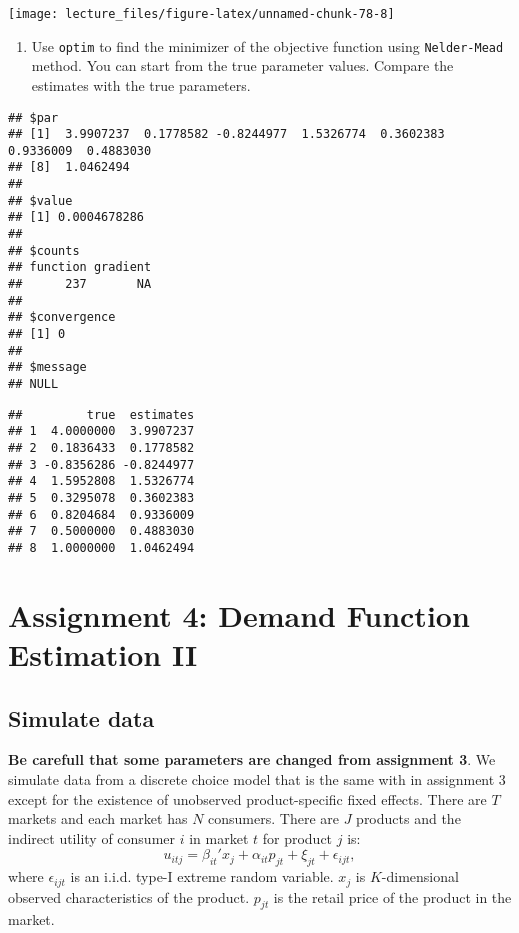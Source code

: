 \documentclass[
]{book}
\providecommand{\tightlist}{%
  \setlength{\itemsep}{0pt}\setlength{\parskip}{0pt}}
\begin{document}
\begin{center}\texttt{[image: lecture\_files/figure-latex/unnamed-chunk-78-8]} \end{center}

\begin{enumerate}
\def\labelenumi{\arabic{enumi}.}
\setcounter{enumi}{7}
\tightlist
\item
  Use \texttt{optim} to find the minimizer of the objective function using \texttt{Nelder-Mead} method. You can start from the true parameter values. Compare the estimates with the true parameters.
\end{enumerate}

\begin{verbatim}
## $par
## [1]  3.9907237  0.1778582 -0.8244977  1.5326774  0.3602383  0.9336009  0.4883030
## [8]  1.0462494
## 
## $value
## [1] 0.0004678286
## 
## $counts
## function gradient 
##      237       NA 
## 
## $convergence
## [1] 0
## 
## $message
## NULL
\end{verbatim}

\begin{verbatim}
##         true  estimates
## 1  4.0000000  3.9907237
## 2  0.1836433  0.1778582
## 3 -0.8356286 -0.8244977
## 4  1.5952808  1.5326774
## 5  0.3295078  0.3602383
## 6  0.8204684  0.9336009
## 7  0.5000000  0.4883030
## 8  1.0000000  1.0462494
\end{verbatim}

\hypertarget{assignment4}{%
\chapter{Assignment 4: Demand Function Estimation II}\label{assignment4}}

\hypertarget{simulate-data-3}{%
\section{Simulate data}\label{simulate-data-3}}

\textbf{Be carefull that some parameters are changed from assignment 3}. We simulate data from a discrete choice model that is the same with in assignment 3 except for the existence of unobserved product-specific fixed effects. There are \(T\) markets and each market has \(N\) consumers. There are \(J\) products and the indirect utility of consumer \(i\) in market \(t\) for product \(j\) is:
\[
u_{itj} = \beta_{it}' x_j + \alpha_{it} p_{jt} + \xi_{jt} + \epsilon_{ijt},
\]
where \(\epsilon_{ijt}\) is an i.i.d. type-I extreme random variable. \(x_j\) is \(K\)-dimensional observed characteristics of the product. \(p_{jt}\) is the retail price of the product in the market.
\end{document}
